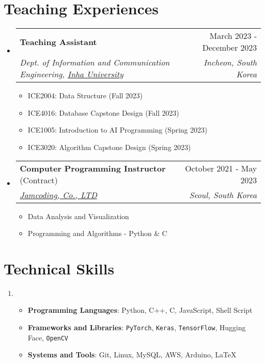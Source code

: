 \documentclass[letterpaper,11pt]{article}
\makeatletter
\newcommand{\resumeSubheading}[4]{
  \vspace{-1pt}\item
    \begin{tabular*}{0.97\textwidth}{l@{\extracolsep{\fill}}r}
      #1 & #2 \\
      \textit{\small#3} & \textit{\small #4} \\
    \end{tabular*}\vspace{-5pt}
}
\makeatother
\begin{document}
    \section{Teaching Experiences}
    \begin{itemize}[leftmargin=*,label=]
        \resumeSubheading
        {\textbf{Teaching Assistant}}{March 2023 - December 2023}
            {Dept. of Information and Communication Engineering, \href{https://eng.inha.ac.kr/eng/index.do}{Inha University}}{Incheon, South Korea}
            
            \begin{itemize}[label=\bullet]
                \item{ICE2004: Data Structure (Fall 2023)}
                \item{ICE4016: Database Capstone Design (Fall 2023)}
                \item{ICE1005: Introduction to AI Programming (Spring 2023)}
                \item{ICE3020: Algorithm Capstone Design (Spring 2023)}
            \end{itemize}
            

        \resumeSubheading
        {\textbf{Computer Programming Instructor} (Contract)}{October 2021 - May 2023}
            {\href{https://jamcoding.co.kr/}{Jamcoding, Co., LTD}}{Seoul, South Korea}
            \begin{itemize}[label=\bullet]
                \item{Data Analysis and Visualization}
                \item{Programming and Algorithms - Python \& C}
            \end{itemize}
    \end{itemize}
    
    \section{Technical Skills}
    \begin{enumerate}[noitemsep, leftmargin=*,label=]
        \item{
            \begin{itemize}[label=\bullet]
                \item{\textbf{Programming Languages}: Python, C++, C, JavaScript, Shell Script}
                \item{\textbf{Frameworks and Libraries}: \texttt{PyTorch}, \texttt{Keras}, \texttt{TensorFlow}, Hugging Face, \texttt{OpenCV}}
                \item{\textbf{Systems and Tools}: Git, Linux, MySQL, AWS, Arduino, \LaTeX}
            \end{itemize}
        }
    \end{enumerate}
    
\end{document}
